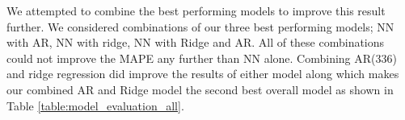 \documentclass[11pt]{article}
\begin{document}
\noindent We attempted to combine the best performing models to improve this result further. We considered combinations of our three best performing models; NN with AR, NN with ridge, NN with Ridge and AR. All of these combinations could not improve the MAPE any further than NN alone.  Combining AR(336) and ridge regression did improve the results of either model along which makes our combined AR and Ridge model the second best overall model as shown in Table \ref{table:model_evaluation_all}.










\end{document}
